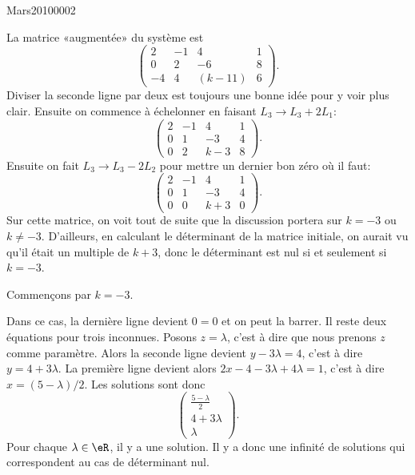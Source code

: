 

\begin{corrige}{Mars20100002}

	La matrice «augmentée» du système est
	\begin{equation}
		\left(\begin{array}{ccc|c}
			 2	&	-1	&	4	&	1	\\
			  0	&	2	&	-6	&	8\\
			   -4	&	4	&	(k-11)	&	6	 
		   \end{array}\right).
	\end{equation}
	Diviser la seconde ligne par deux est toujours une bonne idée pour y voir plus clair. Ensuite on commence à échelonner en faisant $L_3\to L_3+2L_1$:
	\begin{equation}
		\left(\begin{array}{ccc|c}
			 2	&	-1	&	4	&	1	\\
			  0	&	1	&	-3	&	4\\
			   0	&	2	&	k-3	&	8	 
		   \end{array}\right).
	\end{equation}
	Ensuite on fait $L_3\to L_3-2L_2$ pour mettre un dernier bon zéro où il faut:
	\begin{equation}
		\left(\begin{array}{ccc|c}
			 2	&	-1	&	4	&	1	\\
			  0	&	1	&	-3	&	4\\
			   0	&	0	&	k+3	&	0	 
		   \end{array}\right).
	\end{equation}
	Sur cette matrice, on voit tout de suite que la discussion portera sur $k=-3$ ou $k\neq -3$. D'ailleurs, en calculant le déterminant de la matrice initiale, on aurait vu qu'il était un multiple de $k+3$, donc le déterminant est nul si et seulement si $k=-3$.

	Commençons par $k=-3$.

	Dans ce cas, la dernière ligne devient $0=0$ et on peut la barrer. Il reste deux équations pour trois inconnues. Posons $z=\lambda$, c'est à dire que nous prenons $z$ comme paramètre. Alors la seconde ligne devient $y-3\lambda=4$, c'est à dire $y=4+3\lambda$. La première ligne devient alors $2x-4-3\lambda+4\lambda=1$, c'est à dire $x=(5-\lambda)/2$. Les solutions sont donc
	\begin{equation}
		\begin{pmatrix}
			\frac{ 5-\lambda }{2}	\\ 
			4+3\lambda	\\ 
			\lambda	
		\end{pmatrix}.
	\end{equation}
	Pour chaque $\lambda\in\eR$, il y a une solution. Il y a donc une infinité de solutions qui correspondent au cas de déterminant nul.


\end{corrige}
